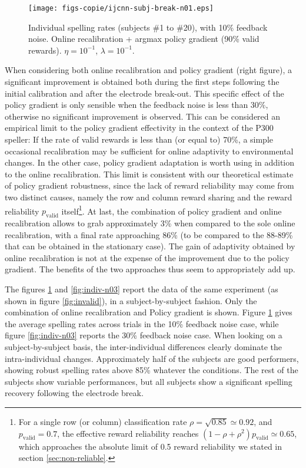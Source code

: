 \documentclass[conference]{IEEEtran}
\begin{document}
\begin{figure}[t!]
	\centerline{
		\texttt{[image: figs-copie/ijcnn-subj-break-n01.eps]}
	}
	\caption{Individual spelling rates (subjects \#1 to \#20), with 10\% feedback noise. Online recalibration + argmax policy gradient (90\% valid rewards).	$\eta = 10^{-1}$, $\lambda = 10^{-1}$.}
	\label{fig:indiv-n01}
\end{figure}

When considering both online recalibration and policy gradient (right figure), a significant improvement is obtained both during the first steps 
following the initial calibration and after the electrode break-out.
This specific effect of the policy gradient is only sensible when the feedback noise is less than 30\%, otherwise no 
significant improvement is observed.
This can be considered an empirical limit to the policy gradient effectivity in the context of the
P300 speller: If the rate of valid rewards is
less than (or equal to) 70\%, a simple occasional recalibration may be sufficient for online adaptivity to environmental
changes. In the other case,  policy gradient adaptation is worth using in addition to the online recalibration.
This limit is consistent with our theoretical estimate of policy gradient robustness, since the lack of reward reliability may come from 
two distinct causes, namely the 
row and column reward sharing and the reward reliability $p_\text{valid}$ itself\footnote{
For a single row (or column) classification rate $\rho = \sqrt{0.85} \simeq 0.92$, and $p_\text{valid} = 0.7$, 
the effective reward reliability reaches
$(1-\rho+\rho^2) p_\text{valid}\simeq 0.65$, 
which approaches the absolute limit of 0.5 reward reliability we 
stated in section \ref{sec:non-reliable}.
}. 
At last, the combination of policy gradient and online recalibration allows to grab approximately 3\% 
when compared to the sole online recalibration, with a final rate approaching 86\% (to be compared to the 88-89\% 
that can be obtained in the stationary case).
The gain of adaptivity obtained by online recalibration is not at the expense of the improvement
due to the policy gradient. The benefits of the two approaches thus seem to appropriately add up.

	The figures \ref{fig:indiv-n01} and \ref{fig:indiv-n03} report the data of the same experiment (as shown in figure \ref{fig:invalid}), in a subject-by-subject fashion. Only the combination of online recalibration and Policy gradient is shown. Figure \ref{fig:indiv-n01} gives the average spelling rates across trials in the 10\% feedback noise case, while figure \ref{fig:indiv-n03} reports the 30\% feedback noise case. 
When looking on a subject-by-subject basis, the inter-individual differences clearly dominate the intra-individual changes.  Approximately half of the subjects are good performers, showing robust spelling rates above 85\% whatever the conditions. The rest of the subjects show variable performances, but all subjects show a significant spelling recovery following the electrode break.  
\end{document}
